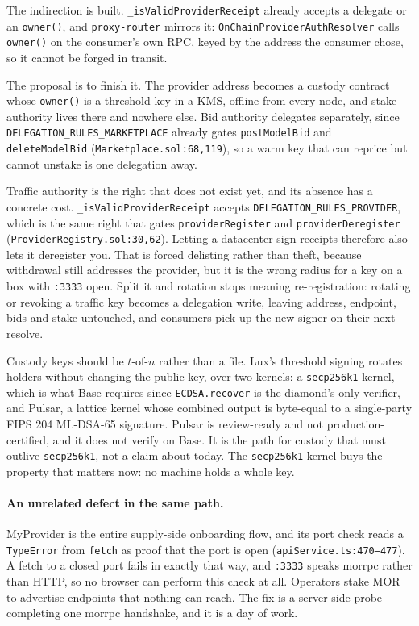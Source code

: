 \documentclass[11pt,a4paper]{article}
\newcommand{\code}[1]{\texttt{\small #1}}
\begin{document}
The indirection is built. \code{\_isValidProviderReceipt} already accepts a
delegate or an \code{owner()}, and \code{proxy-router} mirrors it:
\code{OnChainProviderAuthResolver} calls \code{owner()} on the consumer's own
RPC, keyed by the address the consumer chose, so it cannot be forged in transit.

The proposal is to finish it. The provider address becomes a custody contract
whose \code{owner()} is a threshold key in a KMS, offline from every node, and
stake authority lives there and nowhere else. Bid authority delegates
separately, since \code{DELEGATION\_RULES\_MARKETPLACE} already gates
\code{postModelBid} and \code{deleteModelBid}
(\code{Marketplace.sol:68,119}), so a warm key that can reprice but cannot
unstake is one delegation away.

Traffic authority is the right that does not exist yet, and its absence has a
concrete cost. \code{\_isValidProviderReceipt} accepts
\code{DELEGATION\_RULES\_PROVIDER}, which is the same right that gates
\code{providerRegister} and \code{providerDeregister}
(\code{ProviderRegistry.sol:30,62}). Letting a datacenter sign receipts
therefore also lets it deregister you. That is forced delisting rather than
theft, because withdrawal still addresses the provider, but it is the wrong
radius for a key on a box with \code{:3333} open. Split it and rotation stops
meaning re-registration: rotating or revoking a traffic key becomes a delegation
write, leaving address, endpoint, bids and stake untouched, and consumers pick
up the new signer on their next resolve.

Custody keys should be $t$-of-$n$ rather than a file. Lux's threshold signing
rotates holders without changing the public key, over two kernels: a
\code{secp256k1} kernel, which is what Base requires since \code{ECDSA.recover}
is the diamond's only verifier, and Pulsar, a lattice kernel whose combined
output is byte-equal to a single-party FIPS 204 ML-DSA-65 signature. Pulsar is
review-ready and not production-certified, and it does not verify on Base. It is
the path for custody that must outlive \code{secp256k1}, not a claim about
today. The \code{secp256k1} kernel buys the property that matters now: no
machine holds a whole key.

\paragraph{An unrelated defect in the same path.} MyProvider is the entire
supply-side onboarding flow, and its port check reads a \code{TypeError} from
\code{fetch} as proof that the port is open
(\code{apiService.ts:470--477}). A fetch to a closed port fails in exactly that
way, and \code{:3333} speaks morrpc rather than HTTP, so no browser can perform
this check at all. Operators stake MOR to advertise endpoints that nothing can
reach. The fix is a server-side probe completing one morrpc handshake, and it is
a day of work.
\end{document}
